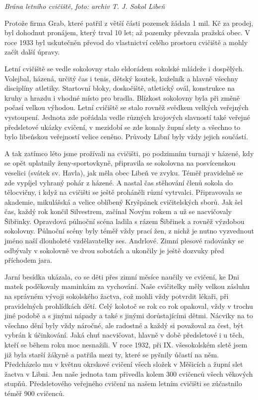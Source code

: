 \emph{Brána letního cvičiště, foto: archiv T. J. Sokol Libeň}

Protože firma Grab, které patřil z větší části pozemek žádala 1 mil. Kč
za prodej, byl dohodnut pronájem, který trval 10 let; až pozemky
převzala pražská obec. V roce 1933 byl uskutečněn převod do vlastnictví
celého prostoru cvičiště a mohly začít další úpravy.

Letní cvičiště se vedle sokolovny stalo eldorádem sokolské mládeže i
dospělých. Volejbal, házená, určitý čas i tenis, dětský koutek, kuželník
a hlavně všechny disciplíny atletiky. Startovní bloky, doskočiště,
atletický ovál, konstrukce na kruhy a hrazdu i vhodné místo pro bradla.
Blízkost sokolovny byla při změně počasí velkou výhodou. Letní cvičiště
se stalo rovněž svědkem velkých veřejných vystoupení. Jednota zde
pořádala vedle různých krojových slavností také veřejné předsletové
ukázky cvičení, v mezidobí se zde konaly župní slety a všechno to bylo
libeňskou veřejností velice ceněno. Průvody Libní byly vždy jejich
součástí.

A tak zatímco léto jsme prožívali na cvičišti, po podzimním turnaji v
házené, kdy se opět uplatnily ženy-sportovkyně, připravila se sokolovna
na posvícenskou veselici (svátek sv. Havla), jak měla obec Libeň ve
zvyku. Téměř pravidelně se zde vypíjel vyhraný pohár z házené. A nastal
čas stěhování členů sokola do tělocvičny, i když na cvičišti se ještě
proháněli různí vytrvalci. Připravovala se akademie, mikulášská a velice
oblíbený Kryšpánek cvičitelských sborů. Jak šel čas, každý rok končil
Silvestrem, začínal Novým rokem a už se nacvičovaly Šibřinky. Opravdová
půlnoční scéna ladila s rázem Šibřinek a rovněž výzdobou sokolovny.
Půlnoční scény byly téměř vždy prací žen, z nichž je nutno vyzvednout
jméno naší dlouholeté vzdělavatelky ses. Andrlové. Zimní plesové
radovánky se odbývaly v sokolovně ve dvou sobotách a ukončily je ještě
dozvuky před příchodem jara.

Jarní besídka ukázala, co se děti přes zimní měsíce naučily ve cvičení,
ke Dni matek poděkovaly maminkám za vychování. Naše cvičitelky měly
velkou zásluhu na správném vývoji sokolského žactva, což mohli vždy
potvrdit lékaři, při pravidelných prohlídkách dětí. Celý kolotoč se rok
co rok opakoval, vždy v trochu jiné podobě a s jinými nápady a také s
jinými dorůstajícími dětmi. Nácviky na to všechno dění byly vždy
náročné, ale radostné a každý si považoval za čest, být vybrán k
účinkování. Jaká chuť nacvičovat, hlavně v době předsletové i u těch,
kteří se během roku moc nesnažili. V roce 1932, při IX. všesokolském
sletě jsem již byla starší žákyně a patřila mezi ty, které se pyšnily
účastí na něm. Předcházelo mu v květnu okrskové cvičení všech složek v
Měšicích a župní slet žactva v Libni. Jen naše jednota tam přivedla
kolem 300 cvičenců všech věkových stupňů. Předsletového veřejného
cvičení na našem letním cvičišti se zúčastnilo téměř 900 cvičenců.

